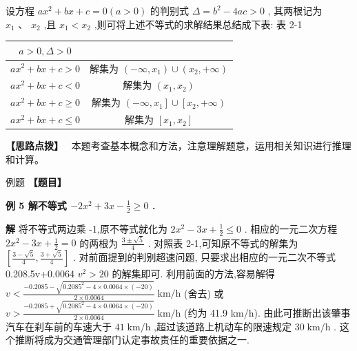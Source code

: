 \documentclass[a4paper,10pt,oneside,fontset=none]{ctexbook}
\renewcommand{\geq}{\geqslant}
\renewcommand{\leq}{\leqslant}
\newcounter{example}[chapter]
\newenvironment{example}[1][]{\begin{exBox}{例题}{#1}}{\end{exBox}}
\numberwithin{equation}{chapter}
\newenvironment{solution}{\begin{solutionBox}}{\end{solutionBox}}
\newenvironment{hint}{\begin{hintBox}\textbf{【思路点拨】}~}{\end{hintBox}}
\begin{document}
\begin{solution}
设方程 $a{x}^{2} + {bx} + c = 0\left( {a > 0}\right)$ 的判别式 $\Delta  = {b}^{2} - {4ac} > 0$ , 其两根记为 ${x}_{1}\text{ 、 }{x}_{2}$ ,且 ${x}_{1} < {x}_{2}$ ,则可将上述不等式的求解结果总结成下表:
表 2-1
\begin{center}
\begin{tabular}{|c|c|}
\hline
$a > 0,\Delta  > 0$ \\\hline
$a{x}^{2} + {bx} + c > 0$ & 解集为 $\left( {-\infty ,{x}_{1}}\right)  \cup  \left( {{x}_{2}, + \infty }\right)$ \\
$a{x}^{2} + {bx} + c < 0$ & 解集为 $\left( {{x}_{1},{x}_{2}}\right)$ \\
$a{x}^{2} + {bx} + c \geq  0$ & 解集为 $\left( {-\infty ,{x}_{1}}\right\rbrack   \cup  \left\lbrack  {{x}_{2}, + \infty }\right)$ \\
$a{x}^{2} + {bx} + c \leq  0$ & 解集为 $\left\lbrack  {{x}_{1},{x}_{2}}\right\rbrack$ \\
\hline
\end{tabular}
\end{center}
\end{solution}

\begin{hint}
本题考查基本概念和方法，注意理解题意，运用相关知识进行推理和计算。
\end{hint}

\begin{example}
\textbf{【题目】}\par\vspace{0.3em}
\textbf{例 5 解不等式 $- 2{x}^{2} + {3x} - \frac{1}{2} \geq  0$ .}\par\vspace{0.3em}
\end{example}

\begin{solution}
\textbf{解}
将不等式两边乘 -1,原不等式就化为 $2{x}^{2} - {3x} + \frac{1}{2} \leq  0$ . 相应的一元二次方程 $2{x}^{2} - {3x} + \frac{1}{2} = 0$ 的两根为 $\frac{3 \pm  \sqrt{5}}{4}$ .
对照表 2-1,可知原不等式的解集为 $\left\lbrack  {\frac{3 - \sqrt{5}}{4},\frac{3 + \sqrt{5}}{4}}\right\rbrack$ .
对前面提到的判别超速问题, 只要求出相应的一元二次不等式 0.208.5v+0.0064 ${v}^{2} > {20}$ 的解集即可. 利用前面的方法,容易解得 $v < \frac{-{0.2085} - \sqrt{{0.2085}^{2} - 4 \times  {0.0064} \times  \left( {-{20}}\right) }}{2 \times  {0.0064}}\mathrm{\;{km}}/\mathrm{h}$ (舍去) 或 $v > \frac{-{0.2085} + \sqrt{{0.2085}^{2} - 4 \times  {0.0064} \times  \left( {-{20}}\right) }}{2 \times  {0.0064}}\mathrm{\;{km}}/\mathrm{h}$ (约为 41.9 km/h).
由此可推断出该肇事汽车在刹车前的车速大于 ${41}\mathrm{\;{km}}/\mathrm{h}$ ,超过该道路上机动车的限速规定 ${30}\mathrm{\;{km}}/\mathrm{h}$ . 这个推断将成为交通管理部门认定事故责任的重要依据之一.
\end{solution}
\end{document}
